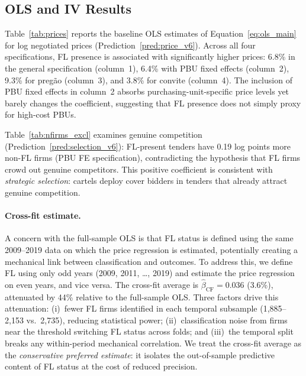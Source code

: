 


\subsection{OLS and IV Results}
\label{sec:results_ols}

Table~\ref{tab:prices} reports the baseline OLS estimates of
Equation~\eqref{eq:ols_main} for log negotiated prices
(Prediction~\ref{pred:price_v6}). Across all four
specifications, FL presence is associated with significantly higher
prices: 6.8\% in the general specification (column~1), 6.4\% with PBU
fixed effects (column~2), 9.3\% for preg\~ao (column~3), and 3.8\% for
convite (column~4). The inclusion of PBU fixed effects in column~2
absorbs purchasing-unit-specific price levels yet barely changes the
coefficient, suggesting that FL presence does not simply proxy for
high-cost PBUs.



Table~\ref{tab:nfirms_excl} examines genuine competition
(Prediction~\ref{pred:selection_v6}): FL-present
tenders have 0.19 log points more non-FL firms (PBU FE specification),
contradicting the hypothesis that FL firms crowd out genuine competitors.
This positive coefficient is consistent with \emph{strategic selection}:
cartels deploy cover bidders in tenders that already attract genuine
competition.



\paragraph{Cross-fit estimate.}
A concern with the full-sample OLS is that FL status is defined using
the same 2009--2019 data on which the price regression is estimated,
potentially creating a mechanical link between classification and
outcomes. To address this, we define FL using only odd years
(2009, 2011, \ldots, 2019) and estimate the price regression on even
years, and vice versa. The cross-fit average is $\hat{\beta}_{\text{CF}}
= 0.036$ (3.6\%), attenuated by 44\% relative to the full-sample OLS.
Three factors drive this attenuation: (i)~fewer FL firms identified in
each temporal subsample (1,885--2,153 vs.\ 2,735), reducing
statistical power; (ii)~classification noise from firms near the
threshold switching FL status across folds; and (iii)~the temporal
split breaks any within-period mechanical correlation. We treat the
cross-fit average as the \emph{conservative preferred estimate}: it
isolates the out-of-sample predictive content of FL status at the cost
of reduced precision.

